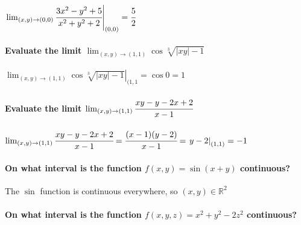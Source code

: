 \documentclass[
  letterpaper,
  DIV=11,
  numbers=noendperiod]{scrartcl}
\let\oldparagraph\paragraph
\renewcommand{\paragraph}[1]{\oldparagraph{#1}\mbox{}}
\begin{document}
\(\left.\lim_{(x, y) \rightarrow (0, 0)} \cfrac{3x^2-y^2+5}{x^2+y^2+2}\right\vert_{(0,0)} = \cfrac{5}{2}\)

\hypertarget{evaluate-the-limit-lim_x-y-rightarrow-1-1-cossqrt3xy-1}{%
\paragraph{\texorpdfstring{Evaluate the limit
\(\lim_{(x, y) \rightarrow (1, 1)} \cos\sqrt[3]{|xy|-1}\)}{Evaluate the limit \textbackslash lim\_\{(x, y) \textbackslash rightarrow (1, 1)\} \textbackslash cos\textbackslash sqrt{[}3{]}\{\textbar xy\textbar-1\}}}\label{evaluate-the-limit-lim_x-y-rightarrow-1-1-cossqrt3xy-1}}

\(\left.\lim_{(x, y) \rightarrow (1, 1)} \cos\sqrt[3]{|xy|-1}\right\vert_{(1, 1} = \cos0 = 1\)

\hypertarget{evaluate-the-limit-lim_x-y-rightarrow-1-1-cfracxy-y-2x2x-1}{%
\paragraph{\texorpdfstring{Evaluate the limit
\(\lim_{(x, y) \rightarrow (1, 1)} \cfrac{xy-y-2x+2}{x-1}\)}{Evaluate the limit \textbackslash lim\_\{(x, y) \textbackslash rightarrow (1, 1)\} \textbackslash cfrac\{xy-y-2x+2\}\{x-1\}}}\label{evaluate-the-limit-lim_x-y-rightarrow-1-1-cfracxy-y-2x2x-1}}

\(\lim_{(x, y) \rightarrow (1, 1)} \cfrac{xy-y-2x+2}{x-1}=\cfrac{(x-1)(y-2)}{x-1}=\left.y-2\right\vert_{(1,1)} = -1\)

\hypertarget{on-what-interval-is-the-function-fx-y-sinxy-continuous}{%
\paragraph{\texorpdfstring{On what interval is the function
\(f(x, y) = \sin(x+y)\)
continuous?}{On what interval is the function f(x, y) = \textbackslash sin(x+y) continuous?}}\label{on-what-interval-is-the-function-fx-y-sinxy-continuous}}

The \(\sin\) function is continuous everywhere, so
\((x, y) \in \mathbb{R}^2\)

\hypertarget{on-what-interval-is-the-function-fx-y-z-x2y2-2z2-continuous}{%
\paragraph{\texorpdfstring{On what interval is the function
\(f(x, y, z) = x^2+y^2-2z^2\)
continuous?}{On what interval is the function f(x, y, z) = x\^{}2+y\^{}2-2z\^{}2 continuous?}}\label{on-what-interval-is-the-function-fx-y-z-x2y2-2z2-continuous}}
\end{document}

